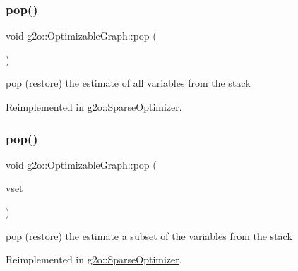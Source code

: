 \mbox{\label{structg2o_1_1_optimizable_graph_a8487f537b16ac7a2ee416ea294a1e22e}} 
\subsubsection{\texorpdfstring{pop()}{pop()}\hspace{0.1cm}{\footnotesize\ttfamily [1/2]}}
{\footnotesize\ttfamily void g2o\+::\+Optimizable\+Graph\+::pop (\begin{DoxyParamCaption}{ }\end{DoxyParamCaption})\hspace{0.3cm}{\ttfamily [virtual]}}



pop (restore) the estimate of all variables from the stack 



Reimplemented in \mbox{\hyperlink{classg2o_1_1_sparse_optimizer_ad2f7f62ebe17b40e050f0525db64355b}{g2o\+::\+Sparse\+Optimizer}}.

\mbox{\label{structg2o_1_1_optimizable_graph_a83425dbe755d22877ba692e93e04a6af}} 
\subsubsection{\texorpdfstring{pop()}{pop()}\hspace{0.1cm}{\footnotesize\ttfamily [2/2]}}
{\footnotesize\ttfamily void g2o\+::\+Optimizable\+Graph\+::pop (\begin{DoxyParamCaption}\item[{\mbox{\hyperlink{classg2o_1_1_hyper_graph_a703938cdb4bb636860eed55a2489d70c}{Hyper\+Graph\+::\+Vertex\+Set}} \&}]{vset }\end{DoxyParamCaption})\hspace{0.3cm}{\ttfamily [virtual]}}



pop (restore) the estimate a subset of the variables from the stack 



Reimplemented in \mbox{\hyperlink{classg2o_1_1_sparse_optimizer_aa6688f8636bf89ef919d72947692d59c}{g2o\+::\+Sparse\+Optimizer}}.

